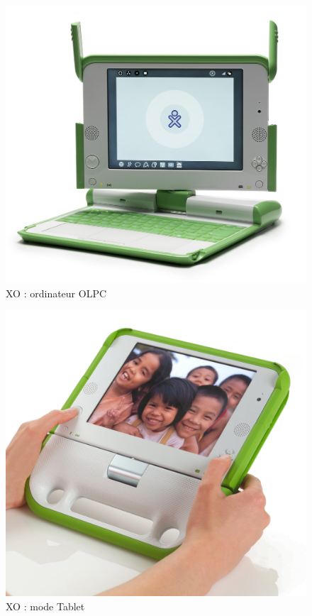 \begin{figure}[H]
  \centering
  \includegraphics[width=.6\textwidth]{../resources/illustrations/olpc2}
  \caption{XO : ordinateur OLPC}
\end{figure}
\begin{minipage}{.5\linewidth}
  \begin{figure}[H]
    \includegraphics[width=\textwidth]{../resources/illustrations/olpc1}
    \caption{XO : mode Tablet}
  \end{figure}
\end{minipage}
